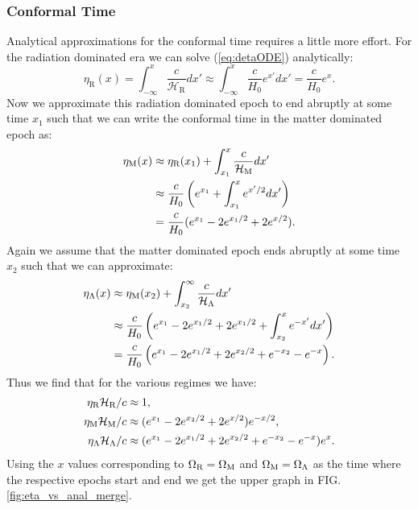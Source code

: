 \documentclass[%
reprint,
 amsmath,amssymb,
 aps,
]{revtex4-2}
\newcommand{\Hp}{\mathcal{H}}
\begin{document}
\subsubsection{Conformal Time}
Analytical approximations for the conformal time requires a little more effort. For the radiation dominated era we can solve (\ref{eq:detaODE}) analytically:
\[\eta_\text{R}(x)=\int_{-\infty}^x\frac{c}{\Hp_\text{R}}dx'\approx\int_{-\infty}^x\frac{c}{H_0}e^{x'}dx'=\frac{c}{H_0}e^x.\]
Now we approximate this radiation dominated epoch to end abruptly at some time $x_1$ such that we can write the conformal time in the matter dominated epoch as:
\begin{align*}
	\eta_\text M(x)&\approx\eta_\text{R}(x_1)+\int_{x_1}^x\frac{c}{\Hp_\text M}dx'\\
	&\approx\frac{c}{H_0}\left(e^{x_1}+\int_{x_1}^xe^{x'/2}dx' \right)\\
	&=\frac{c}{H_0}(e^{x_1}-2e^{x_1/2}+2e^{x/2}).
\end{align*}
Again we assume that the matter dominated epoch ends abruptly at some time $x_2$ such that we can approximate:
\begin{align*}
	\eta_\Lambda(x)&\approx\eta_\text M(x_2)+\int_{x_2}^\infty\frac{c}{\Hp_\Lambda}dx'\\
	&\approx\frac{c}{H_0}\left(e^{x_1}-2e^{x_1/2}+2e^{x_1/2}+\int_{x_2}^x e^{-x'}dx' \right)\\
	&=\frac{c}{H_0}\left(e^{x_1}-2e^{x_1/2}+2e^{x_2/2}+e^{-x_2}-e^{-x} \right).
\end{align*}
Thus we find that for the various regimes we have:
\begin{align*}
	\eta_\text{R}\Hp_\text{R}/c&\approx1,\\
	\eta_\text M\Hp_\text M/c&\approx(e^{x_1}-2e^{x_2/2}+2e^{x/2})e^{-x/2},\\
	\eta_\Lambda\Hp_\Lambda/c&\approx(e^{x_1}-2e^{x_1/2}+2e^{x_2/2}+e^{-x_2}-e^{-x})e^{x}.
\end{align*}
Using the $x$ values corresponding to $\Omega_{\text{R}}=\Omega_\text M$ and $\Omega_{\text M}=\Omega_\Lambda$ as the time where the respective epochs start and end we get the upper graph in FIG. \ref{fig:eta_vs_anal_merge}.
\end{document}
